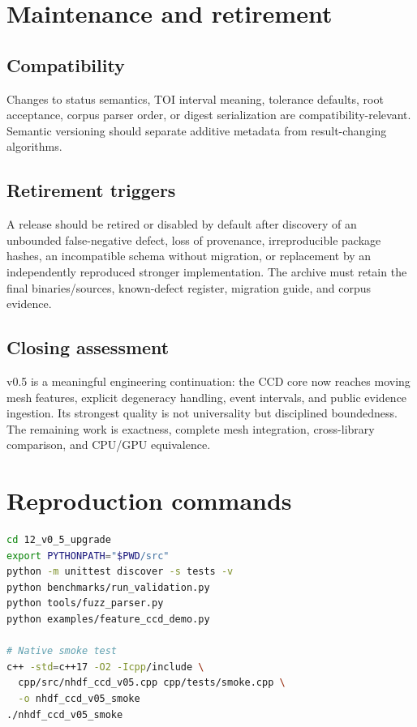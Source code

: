 \documentclass[11pt,a4paper,oneside]{book}
\begin{document}
\chapter{Maintenance and retirement}
\section{Compatibility}

Changes to status semantics, TOI interval meaning, tolerance defaults, root acceptance, corpus parser order, or digest serialization are compatibility-relevant. Semantic versioning should separate additive metadata from result-changing algorithms.

\section{Retirement triggers}

A release should be retired or disabled by default after discovery of an unbounded false-negative defect, loss of provenance, irreproducible package hashes, an incompatible schema without migration, or replacement by an independently reproduced stronger implementation. The archive must retain the final binaries/sources, known-defect register, migration guide, and corpus evidence.

\section{Closing assessment}

v0.5 is a meaningful engineering continuation: the CCD core now reaches moving mesh features, explicit degeneracy handling, event intervals, and public evidence ingestion. Its strongest quality is not universality but disciplined boundedness. The remaining work is exactness, complete mesh integration, cross-library comparison, and CPU/GPU equivalence.

\appendix
\chapter{Reproduction commands}

\begin{lstlisting}[language=bash]
cd 12_v0_5_upgrade
export PYTHONPATH="$PWD/src"
python -m unittest discover -s tests -v
python benchmarks/run_validation.py
python tools/fuzz_parser.py
python examples/feature_ccd_demo.py

# Native smoke test
c++ -std=c++17 -O2 -Icpp/include \
  cpp/src/nhdf_ccd_v05.cpp cpp/tests/smoke.cpp \
  -o nhdf_ccd_v05_smoke
./nhdf_ccd_v05_smoke
\end{lstlisting}
\end{document}
